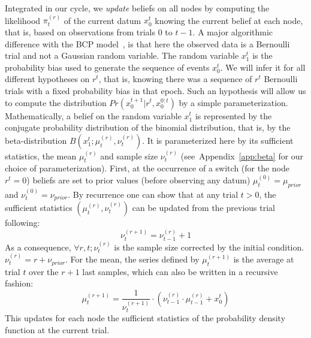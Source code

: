 \documentclass[10pt,letterpaper]{article}
\newcommand{\eql}[1]{\begin{equation}#1\end{equation}}
\newcommand{\citep}[1]{\cite{#1}}
\newcommand{\seeFig}[1]{Figure~\ref{fig:#1}}
\newcommand{\seeEq}[1]{Equation~\ref{eq:#1}}
\newcommand{\seeApp}[1]{Appendix~\ref{app:#1}}
\begin{document}
Integrated in our cycle, we \emph{update} beliefs on all nodes
by computing the likelihood $\pi^{(r)}_t$ of the current datum $x_0^{t}$
knowing the current belief at each node,
that is, based on observations from trials $0$ to $t-1$. %
A major algorithmic difference with the BCP model~\citep{AdamsMackay2007},
is that here the observed data is a Bernoulli trial and not a Gaussian random variable.
The random variable $x_1^t$ is the probability bias used
to generate the sequence of events $x_0^t$.
We will infer it for all different hypotheses on $r^t$,
that is, knowing there was a sequence of $r^t$ Bernoulli trials
with a fixed probability bias in that epoch.
Such an hypothesis will allow us to compute the distribution
$Pr(x_0^{t+1} | r^{t}, x_0^{0:t})$
by a simple parameterization.
Mathematically, a belief on the random variable $x_1^t$ is represented
by the conjugate probability distribution of the binomial distribution,
that is, by the beta-distribution $B(x_1^t; \mu^{(r)}_{t}, \nu^{(r)}_{t})$.
It is parameterized here by its sufficient statistics,
the mean $\mu^{(r)}_{t}$ and sample size $\nu^{(r)}_{t}$ %
(see~\seeApp{beta} for our choice of parameterization).
First, at the occurrence of a switch (for the node $r^t=0$)
beliefs are set to prior values (before observing any datum)
$\mu^{(0)}_{t} = \mu_{prior}$ and $\nu^{(0)}_{t} = \nu_{prior}$.
By recurrence %
one can show that at any trial $t>0$,
the sufficient statistics $(\mu^{(r)}_{t}, \nu^{(r)}_{t})$
can be updated from the previous trial following:
\eql{
\nu^{(r+1)}_{t} = \nu^{(r)}_{t-1} + 1
\label{eq:update_nu}
}
As a consequence, $\forall r, t; \nu^{(r)}_{t}$ is the sample size corrected by the initial condition.
$\nu^{(r)}_{t} = r + \nu_{prior}$. For the mean, the series defined by $\mu^{(r+1)}_{t}$ is the average at trial $t$ over the $r+1$ last samples, which can also be written in a recursive fashion:
\eql{
\mu^{(r+1)}_{t} = \frac{1}{\nu^{(r+1)}_{t}} \cdot (\nu^{(r)}_{t-1} \cdot \mu^{(r)}_{t-1} +  x_0^{t})
\label{eq:update_mu}
}
This updates for each node the sufficient statistics of the probability density function at the current trial.
\end{document}
